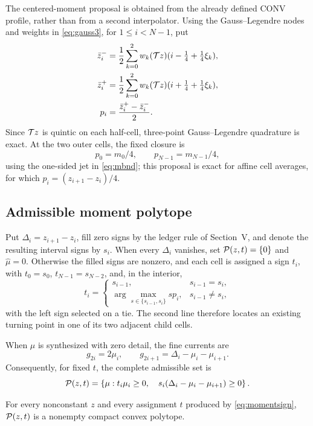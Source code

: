 The centered-moment proposal is obtained from the already defined CONV
profile, rather than from a second interpolator. Using the Gauss--Legendre
nodes and weights in \eqref{eq:gauss3}, for \(1\leq i<N-1\), put
\begin{align}
 \bar z_i^-&=\frac12\sum_{k=0}^{2}w_k
 (\mathcal{T} z)(i-\tfrac14+\tfrac14\xi_k),\nonumber\\
 \bar z_i^+&=\frac12\sum_{k=0}^{2}w_k
 (\mathcal{T} z)(i+\tfrac14+\tfrac14\xi_k),
 \label{eq:halfcells}\\
 p_i&=\frac{\bar z_i^+-\bar z_i^-}{2}.
 \label{eq:momentproposal}
\end{align}
Since \(\mathcal{T} z\) is quintic on each half-cell, three-point Gauss--Legendre
quadrature is exact. At the two outer cells, the fixed closure is
\begin{equation}
 p_0=m_0/4,\qquad p_{N-1}=m_{N-1}/4,
 \label{eq:momentboundary}
\end{equation}
using the one-sided jet in \eqref{eq:mbnd}; this proposal is exact for affine
cell averages, for which \(p_i=(z_{i+1}-z_i)/4\).

\subsection{Admissible moment polytope}

Put \(\Delta_i=z_{i+1}-z_i\), fill zero signs by the ledger rule of
Section~V, and denote the resulting interval signs by \(s_i\). When every
\(\Delta_i\) vanishes, set \(\mathcal{P}(z,t)=\{0\}\) and
\(\widehat\mu=0\). Otherwise the filled signs are nonzero, and each cell is
assigned a sign \(t_i\), with \(t_0=s_0\),
\(t_{N-1}=s_{N-2}\), and, in the interior,
\begin{equation}
 t_i=\begin{cases}
 s_{i-1},&s_{i-1}=s_i,\\
 \arg\max_{s\in\{s_{i-1},s_i\}}sp_i,&s_{i-1}\ne s_i,
 \end{cases}
 \label{eq:momentsign}
\end{equation}
with the left sign selected on a tie. The second line therefore locates an
existing turning point in one of its two adjacent child cells.

When \(\mu\) is synthesized with zero detail, the fine currents are
\begin{equation}
 g_{2i}=2\mu_i,\qquad
 g_{2i+1}=\Delta_i-\mu_i-\mu_{i+1}.
 \label{eq:finecurrentmoment}
\end{equation}
Consequently, for fixed \(t\), the complete admissible set is
\begin{equation}
 \mathcal{P}(z,t)=\left\{\mu:
 t_i\mu_i\geq0,\quad
 s_i(\Delta_i-\mu_i-\mu_{i+1})\geq0
 \right\}.
 \label{eq:momentpolytope}
\end{equation}
\begin{lemma}
For every nonconstant \(z\) and every assignment \(t\) produced by
\eqref{eq:momentsign}, \(\mathcal{P}(z,t)\) is a nonempty compact convex polytope.
\end{lemma}

